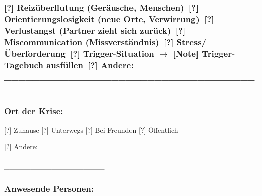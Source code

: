 \hypertarget{reizuxfcberflutung-geruxe4usche-menschen-orientierungslosigkeit-neue-orte-verwirrung-verlustangst-partner-zieht-sich-zuruxfcck-miscommunication-missverstuxe4ndnis-stressuxfcberforderung-trigger-situation-trigger-tagebuch-ausfuxfcllen-andere-________________________________________________________}{%
\subsubsection{\texorpdfstring{[?] Reizüberflutung (Geräusche, Menschen)\
[?] Orientierungslosigkeit (neue Orte, Verwirrung)\
[?] Verlustangst (Partner zieht sich zurück)\
[?] Miscommunication (Missverständnis)\
[?] Stress/Überforderung\
[?] Trigger-Situation $\rightarrow$ \textbf{[Note] Trigger-Tagebuch ausfüllen}\
[?] Andere: \_\_\_\_\_\_\_\_\_\_\_\_\_\_\_\_\_\_\_\_\_\_\_\_\_\_\_\_\_\_\_\_\_\_\_\_\_\_\_\_\_\_\_\_\_\_\_\_\_\_\_\_\_\_\_\_}{[?] Reizüberflutung (Geräusche, Menschen) [?] Orientierungslosigkeit (neue Orte, Verwirrung) [?] Verlustangst (Partner zieht sich zurück) [?] Miscommunication (Missverständnis) [?] Stress/Überforderung [?] Trigger-Situation $\rightarrow$ [Note] Trigger-Tagebuch ausfüllen [?] Andere: \_\_\_\_\_\_\_\_\_\_\_\_\_\_\_\_\_\_\_\_\_\_\_\_\_\_\_\_\_\_\_\_\_\_\_\_\_\_\_\_\_\_\_\_\_\_\_\_\_\_\_\_\_\_\_\_}}\label{reizuxfcberflutung-geruxe4usche-menschen-orientierungslosigkeit-neue-orte-verwirrung-verlustangst-partner-zieht-sich-zuruxfcck-miscommunication-missverstuxe4ndnis-stressuxfcberforderung-trigger-situation-trigger-tagebuch-ausfuxfcllen-andere-________________________________________________________}}

\hypertarget{ort-der-krise}{%
\subsubsection{\texorpdfstring{\textbf{Ort der Krise:}}{Ort der Krise:}}\label{ort-der-krise}}

[?] Zuhause [?] Unterwegs [?] Bei Freunden [?] Öffentlich

[?] Andere: \_\_\_\_\_\_\_\_\_\_\_\_\_\_\_\_\_\_\_\_\_\_\_\_\_\_\_\_\_\_\_\_\_\_\_\_\_\_\_\_\_\_\_\_\_\_\_\_\_\_\_\_\_\_\_\_\_\_\_\_\_\_\_\_\_\_\_

\hypertarget{anwesende-personen}{%
\subsubsection{\texorpdfstring{\textbf{Anwesende Personen:}}{Anwesende Personen:}}\label{anwesende-personen}}

